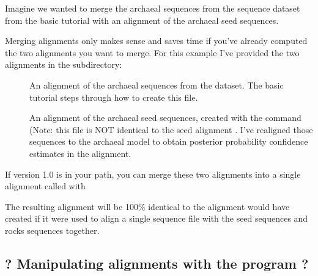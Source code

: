 Imagine we wanted to merge the archaeal sequences from the
 sequence dataset from the basic tutorial with 
an alignment of the archaeal seed sequences. 

Merging alignments only makes sense and saves time if you've already
computed the two alignments you want to merge. For this example I've
provided the two alignments in the  subdirectory:

\begin{description}
\item[]
  An alignment of the archaeal sequences from the 
  dataset. The basic tutorial steps through how to create this file.

\item[]
  An alignment of the archaeal seed sequences, created with the
  command 
  (Note: this file is NOT identical to the seed alignment
  . I've realigned those sequences to the
  archaeal model to obtain posterior probability confidence estimates
  in the alignment. 
\end{description}

If  version 1.0 is in your path, you 
can merge these two alignments into a single alignment called
 with


The resulting alignment will be 100\% identical to the alignment
 would have created if it were used to align a single
sequence file with the seed sequences and rocks sequences together.

\subsection{? Manipulating alignments with the
   program ?}

